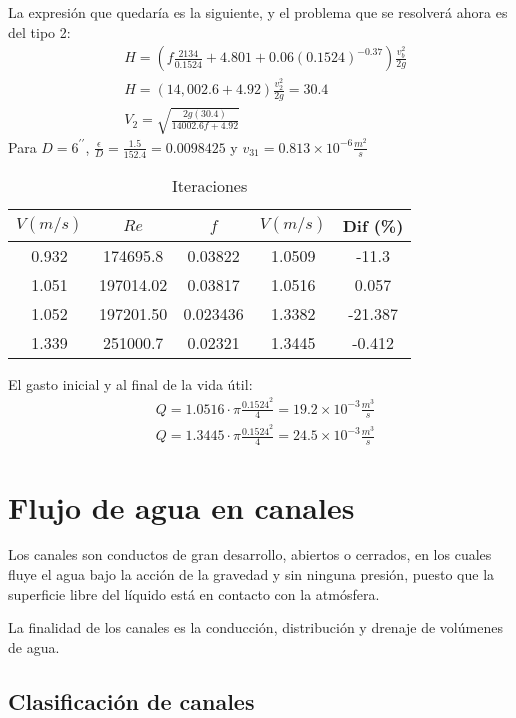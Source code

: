 La expresión que quedaría es la siguiente, y el problema que se resolverá ahora es del tipo 2:
\begin{align*}
    &H =\left(f\frac{2134}{0.1524} + 4.801 + 0.06(0.1524)^{ - 0.37} \right)\frac{v_b^2}{2g}\\
    &H = \left(14,002.6 + 4.92\right)\frac{v_2^2}{2g} = 30.4 \\
    &V_2 = \sqrt{\frac{2g(30.4)}{14002.6f + 4.92}}
\end{align*}
Para $D=6^{\prime\prime}$, $\frac{\epsilon}{D}=\frac{1.5}{152.4}=0.0098425$ y $v_{31}=0.813\times 10^{-6}\frac{m^2}{s}$
\begin{table}[h!]
    \centering
    \begin{tabular}{@{}ccccc@{}}
    \toprule
    $V(m/s)$ & $Re$      & $f$     & $V(m/s)$ & Dif (\%) \\ \midrule
    0.932    & 174695.8  & 0.03822 & 1.0509   & -11.3    \\
    1.051    & 197014.02 & 0.03817 & 1.0516   & 0.057    \\ 
    1.052    & 197201.50 & 0.023436& 1.3382   & -21.387  \\
    1.339    & 251000.7  & 0.02321 & 1.3445   & -0.412   \\ \bottomrule
    \end{tabular}
    \caption{Iteraciones}
    \label{tabhb31}
\end{table}
El gasto inicial y al final de la vida útil:
\begin{align*}
    &Q = 1.0516\cdot \pi\frac{0.1524^2}{4} =19.2 \times 10^{ - 3} \frac{m^3}{s}\\
    &Q = 1.3445\cdot \pi\frac{0.1524^2}{4} = 24.5 \times 10^{ - 3} \frac{m^3}{s}
\end{align*}

\section{Flujo de agua en canales}
Los canales son conductos de gran desarrollo, abiertos o cerrados, en los cuales fluye el agua bajo la acción de la gravedad y sin ninguna presión, puesto que la superficie libre del líquido está en contacto con la atmósfera.

La finalidad de los canales es la conducción, distribución y drenaje de volúmenes de agua.
\subsection{Clasificación de canales}

